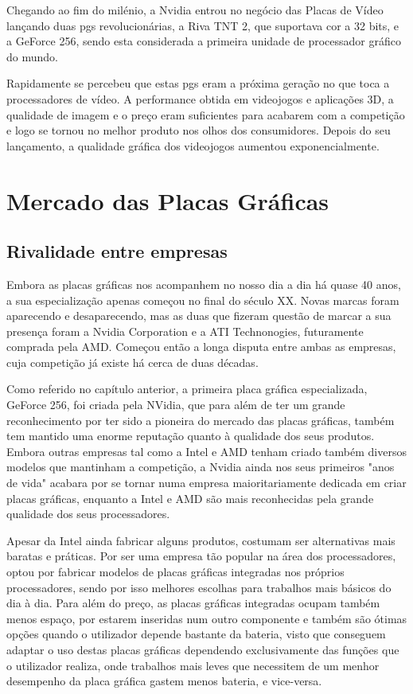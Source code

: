 \documentclass{report}
\begin{document}
Chegando ao fim do milénio, a Nvidia entrou no negócio das Placas de Vídeo lançando duas \acp{pg} revolucionárias, a Riva TNT 2, que suportava cor a 32 bits, e a GeForce 256, sendo esta considerada a primeira unidade de processador gráfico do mundo. 

Rapidamente se percebeu que estas \acp{pg} eram a próxima geração no que toca a processadores de vídeo. A performance obtida em videojogos e aplicações 3D, a qualidade de imagem e o preço eram suficientes para acabarem com a competição e logo se tornou no melhor produto nos olhos dos consumidores. Depois do seu lançamento, a qualidade gráfica dos videojogos aumentou exponencialmente.

\chapter{Mercado das Placas Gráficas}
\section{Rivalidade entre empresas}

Embora as placas gráficas nos acompanhem no nosso dia a dia há quase 40 anos, a sua especialização apenas começou no final do século XX. Novas marcas foram aparecendo e desaparecendo, mas as duas que fizeram questão de marcar a sua presença foram a Nvidia Corporation e a ATI Technonogies, futuramente comprada pela AMD. Começou então a longa disputa entre ambas as empresas, cuja competição já existe há cerca de duas décadas.

\vspace{5mm} Como referido no capítulo anterior, a primeira placa gráfica especializada, GeForce 256, foi criada pela NVidia, que para além de ter um grande reconhecimento por ter sido a pioneira do mercado das placas gráficas, também tem mantido uma enorme reputação quanto à qualidade dos seus produtos. Embora outras empresas tal como a Intel e AMD tenham criado também diversos modelos que mantinham a competição, a Nvidia ainda nos seus primeiros "anos de vida" acabara por se tornar numa empresa maioritariamente dedicada em criar placas gráficas, enquanto a Intel e AMD são mais reconhecidas pela grande qualidade dos seus processadores.

\vspace{5mm} Apesar da Intel ainda fabricar alguns produtos, costumam ser alternativas mais baratas e práticas. Por ser uma empresa tão popular na área dos processadores, optou por fabricar modelos de placas gráficas integradas nos próprios processadores, sendo por isso melhores escolhas para trabalhos mais básicos do dia à dia. Para além do preço, as placas gráficas integradas ocupam também menos espaço, por estarem inseridas num outro componente e também são ótimas opções quando o utilizador depende bastante da bateria, visto que conseguem adaptar o uso destas placas gráficas dependendo exclusivamente das funções que o utilizador realiza, onde trabalhos mais leves que necessitem de um menhor desempenho da placa gráfica gastem menos bateria, e vice-versa.
\end{document}
